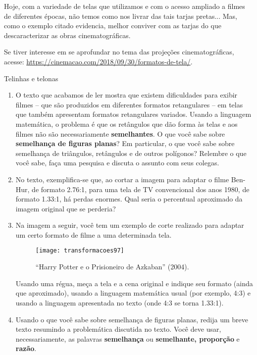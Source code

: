 Hoje, com a variedade de telas que utilizamos e com o acesso ampliado a filmes de diferentes épocas, não temos como nos livrar das tais tarjas pretas... Mas, como o exemplo citado evidencia, melhor conviver com as tarjas do que descaracterizar as obras cinematográficas. 

\begin{knowledge}
Se tiver interesse em se aprofundar no tema das projeções cinematográficas, acesse: \url{https://cinemacao.com/2018/09/30/formatos-de-tela/}.
\end{knowledge}

\begin{task}{Telinhas e telonas}
\begin{enumerate}
\item O texto que acabamos de ler mostra que existem dificuldades para exibir filmes – que são produzidos em diferentes formatos retangulares – em telas que também apresentam formatos retangulares variados. Usando a linguagem matemática, o problema é que os retângulos que dão forma às telas e aos filmes não são necessariamente \textbf{semelhantes}. O que você sabe sobre \textbf{semelhança de figuras planas}? Em particular, o que você sabe sobre semelhança de triângulos, retângulos e de outros polígonos? Relembre o que você sabe, faça uma pesquisa e discuta o assunto com seus colegas.

\item No texto, exemplifica-se que, ao cortar a imagem para adaptar o filme Ben-Hur, de formato 2.76:1, para uma tela de TV convencional dos anos 1980, de formato 1.33:1, há perdas enormes. Qual seria o percentual aproximado da imagem original que se perderia?  

\item Na imagem a seguir, você tem um exemplo de corte realizado para adaptar um certo formato de filme a uma determinada tela. 

\begin{figure}[H]
\centering
 
\texttt{[image: transformacoes97]}
\caption{“Harry Potter e o Prisioneiro de Azkaban” (2004).}

\end{figure} 

Usando uma régua, meça a tela e a cena original e indique seu formato (ainda que aproximado), usando a linguagem matemática usual (por exemplo, 4:3) e usando a linguagem apresentada no texto (onde 4:3 se torna 1.33:1). 

\item Usando o que você sabe sobre semelhança de figuras planas, redija um breve texto resumindo a problemática discutida no texto. Você deve usar, necessariamente, as palavras \textbf{semelhança} ou \textbf{semelhante, proporção} e \textbf{razão}. 
\end{enumerate}
\end{task}


